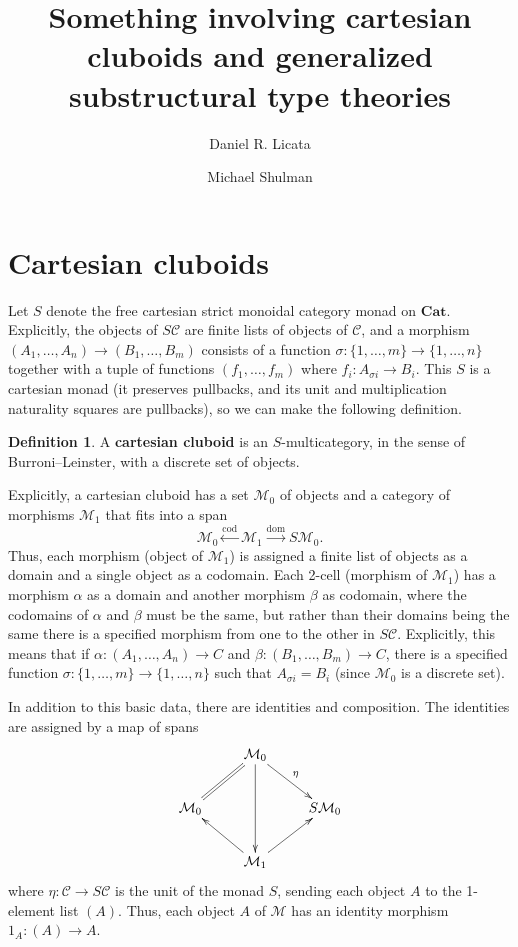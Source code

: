 \documentclass{amsart}
\title{Something involving cartesian cluboids and generalized substructural type theories}
\author{Daniel R. Licata \and Michael Shulman}
\theoremstyle{definition}
\newtheorem{defn}[thm]{Definition}
\def\M{\mathcal{M}}
\def\C{\mathcal{C}}
\begin{document}
\maketitle

\section{Cartesian cluboids}
\label{sec:cluboids}

Let $S$ denote the free cartesian strict monoidal category monad on $\mathbf{Cat}$.
Explicitly, the objects of $S\C$ are finite lists of objects of $\C$, and a morphism $(A_1,\dots,A_n) \to (B_1,\dots,B_m)$ consists of a function $\sigma:\{1,\dots,m\} \to \{1,\dots,n\}$ together with a tuple of functions $(f_1,\dots,f_m)$ where $f_i : A_{\sigma i}\to B_i$.
This $S$ is a cartesian monad (it preserves pullbacks, and its unit and multiplication naturality squares are pullbacks), so we can make the following definition.

\begin{defn}
  A \textbf{cartesian cluboid} is an $S$-multicategory, in the sense of Burroni--Leinster, with a discrete set of objects.
\end{defn}

Explicitly, a cartesian cluboid has a set $\M_0$ of objects and a category of morphisms $\M_1$ that fits into a span
\[ \M_0 \xleftarrow{\mathrm{cod}} \M_1 \xrightarrow{\mathrm{dom}} S\M_0. \]
Thus, each morphism (object of $\M_1$) is assigned a finite list of objects as a domain and a single object as a codomain.
Each 2-cell (morphism of $\M_1$) has a morphism $\alpha$ as a domain and another morphism $\beta$ as codomain, where the codomains of $\alpha$ and $\beta$ must be the same, but rather than their domains being the same there is a specified morphism from one to the other in $S\C$.
Explicitly, this means that if $\alpha:(A_1,\dots,A_n) \to C$ and $\beta:(B_1,\dots,B_m)\to C$, there is a specified function $\sigma:\{1,\dots,m\} \to \{1,\dots,n\}$ such that $A_{\sigma i} = B_i$ (since $\M_0$ is a discrete set).

In addition to this basic data, there are identities and composition.
The identities are assigned by a map of spans
\[ \xymatrix{ & \M_0 \ar@{=}[dl] \ar[dr]^{\eta} \ar[dd] \\ \M_0 && S\M_0 \\ & \M_1 \ar[ul] \ar[ur] } \]
where $\eta:\C \to S\C$ is the unit of the monad $S$, sending each object $A$ to the 1-element list $(A)$.
Thus, each object $A$ of $\M$ has an identity morphism $1_A : (A) \to A$.
\end{document}
